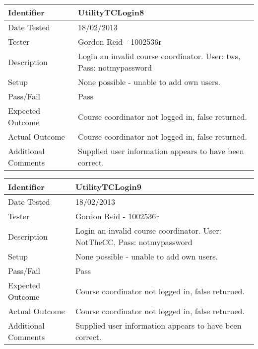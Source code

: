 \documentclass[11pt]{l3deliverable}
\begin{document}
\begin{tabularx}{\textwidth}{|T|L|}
\hline
Identifier & UtilityTCLogin8\\
\hline
Date Tested & 18/02/2013\\
\hline
Tester & Gordon Reid - 1002536r\\
\hline
Description & Login an invalid course coordinator. User: tws, Pass: notmypassword\\
\hline
Setup & None possible - unable to add own users.\\
\hline
Pass/Fail & Pass\\
\hline
Expected Outcome & Course coordinator not logged in, false returned.\\
\hline
Actual Outcome & Course coordinator not logged in, false returned.\\
\hline
Additional Comments & Supplied user information appears to have been correct.\\
\hline
\end{tabularx}

\vspace{2em}

\begin{tabularx}{\textwidth}{|T|L|}
\hline
Identifier & UtilityTCLogin9\\
\hline
Date Tested & 18/02/2013\\
\hline
Tester & Gordon Reid - 1002536r\\
\hline
Description & Login an invalid course coordinator. User: NotTheCC, Pass: notmypassword\\
\hline
Setup & None possible - unable to add own users.\\
\hline
Pass/Fail & Pass\\
\hline
Expected Outcome & Course coordinator not logged in, false returned.\\
\hline
Actual Outcome & Course coordinator not logged in, false returned.\\
\hline
Additional Comments & Supplied user information appears to have been correct.\\
\hline
\end{tabularx}
\end{document}
